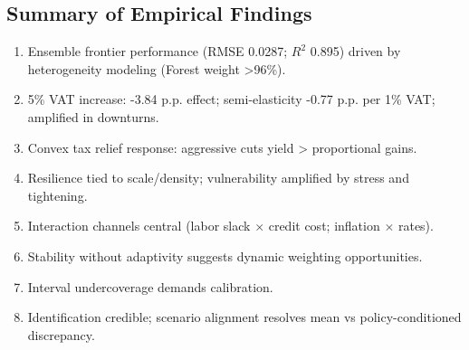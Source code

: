 \subsection{Summary of Empirical Findings}
\begin{enumerate}
  \item Ensemble frontier performance (RMSE 0.0287; $R^2$ 0.895) driven by heterogeneity modeling (Forest weight >96\%).
  \item 5\% VAT increase: -3.84 p.p. effect; semi-elasticity -0.77 p.p. per 1\% VAT; amplified in downturns.
  \item Convex tax relief response: aggressive cuts yield > proportional gains.
  \item Resilience tied to scale/density; vulnerability amplified by stress and tightening.
  \item Interaction channels central (labor slack $\times$ credit cost; inflation $\times$ rates).
  \item Stability without adaptivity suggests dynamic weighting opportunities.
  \item Interval undercoverage demands calibration.
  \item Identification credible; scenario alignment resolves mean vs policy-conditioned discrepancy.
\end{enumerate}
